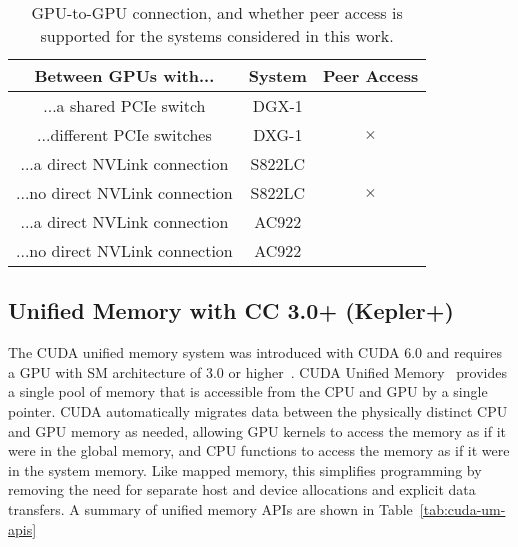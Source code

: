 \begin{table}[ht]
	\centering
	\caption[System support for GPU-GPU Peer Access]{
		GPU-to-GPU connection, and whether peer access is supported for the systems considered in this work.
	}
	\label{tab:cuda-peer-topology}
	\begin{tabular}{ccc}
		\hline
		\textbf{Between GPUs with...}  & \textbf{System} &  \textbf{Peer Access} \\ \hline
		...a shared PCIe switch        & DGX-1           &  \checkmark           \\ \hline
		...different PCIe switches     & DXG-1           &  $\times$             \\ \hline
		...a direct NVLink connection  & S822LC          &  \checkmark           \\ \hline
		...no direct NVLink connection & S822LC          &  $\times$             \\ \hline
		...a direct NVLink connection  & AC922           &  \checkmark           \\ \hline
		...no direct NVLink connection & AC922           &  \checkmark           \\ \hline

	\end{tabular}
\end{table}

\subsection{Unified Memory with CC 3.0+ (Kepler+)}
\label{sec:unified-cc3}

The CUDA unified memory system was introduced with CUDA 6.0 and requires a GPU with SM architecture of 3.0 or higher~\cite{nvidia2014cuda60}.
CUDA Unified Memory~\cite{harris2013cudaunifiedmemory} provides a single pool of memory that is accessible from the CPU and GPU by a single pointer.
CUDA automatically migrates data between the physically distinct CPU and GPU memory as needed, allowing GPU kernels to access the memory as if it were in the global memory, and CPU functions to access the memory as if it were in the system memory.
Like mapped memory, this simplifies programming by removing the need for separate host and device allocations and explicit data transfers.
A summary of unified memory APIs are shown in Table~\ref{tab:cuda-um-apis}

